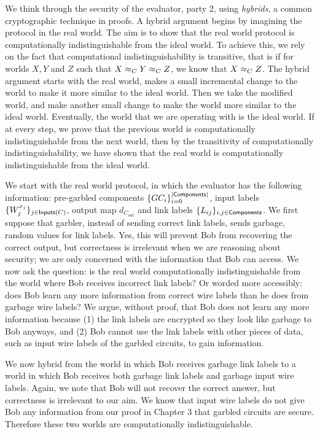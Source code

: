 We think through the security of the evaluator, party 2, using \textit{hybrids}, a common cryptographic technique in proofs. 
A hybrid argument begins by imagining the protocol in the real world. 
The aim is to show that the real world protocol is computationally indistinguishable from the ideal world. 
To achieve this, we rely on the fact that computational indistinguishability is transitive, that is if for worlds $X, Y$ and $Z$ such that $X \approx_C Y \approx_C Z$, we know that $X \approx_C Z$. 
The hybrid argument starts with the real world, makes a small incremental change to the world to make it more similar to the ideal world.
Then we take the modified world, and make another small change to make the world more similar to the ideal world. 
Eventually, the world that we are operating with is the ideal world. 
If at every step, we prove that the previous world is computationally indistinguishable from the next world, then by the transitivity of computationally indistinguishability, we have shown that the real world is computationally indistinguishable from the ideal world. 

We start with the real world protocol, in which the evaluator has the following information: pre-garbled components $\{GC_i\}_{i = 0}^{|\textsf{Components}|}$, input labels $\{W_j^{x_j}\}_{j \in \textsf{Inputs}(C)}$, output map $d_{C_{out}}$ and link labels $\{L_{ij}\}_{i,j \in \textsf{Components}}$.
We first suppose that garbler, instead of sending correct link labels, sends garbage, random values for link labels. 
Yes, this will prevent Bob from recovering the correct output, but correctness is irrelevant when we are reasoning about security; we are only concerned with the information that Bob can access. 
We now ask the question: is the real world computationally indistinguishable from the world where Bob receives incorrect link labels?
Or worded more accessibly: does Bob learn any more information from correct wire labels than he does from garbage wire labels?
We argue, without proof, that Bob does not learn any more information because (1) the link labels are encrypted so they look like garbage to Bob anyways, and (2) Bob cannot use the link labels with other pieces of data, such as input wire labels of the garbled circuits, to gain information. 

We now hybrid from the world in which Bob receives garbage link labels to a world in which Bob receives both garbage link labels and garbage input wire labels. 
Again, we note that Bob will not recover the correct answer, but correctness is irrelevant to our aim. 
We know that input wire labels do not give Bob any information from our proof in Chapter 3 that garbled circuits are secure. 
Therefore these two worlds are computationally indistinguishable. 

